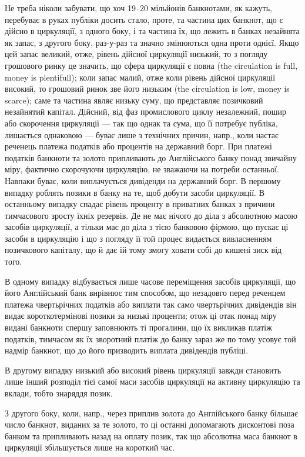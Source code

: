 
Не треба ніколи забувати, що хоч 19--20 мільйонів банкнотами, як
кажуть, перебуває в руках публіки досить стало, проте, та частина цих банкнот,
що є дійсно в циркуляції, з одного боку, і та частина їх, що лежить в банках
незайнята як запас, з другого боку, раз-у-раз та значно змінюються одна
проти однієї. Якщо цей запас великий, отже, рівень дійсної циркуляції низький,
то з погляду грошового ринку це значить, що сфера циркуляції є повна (the
circulation is full, money is plentifull); коли запас малий, отже коли рівень
дійсної циркуляції високий, то грошовий ринок зве його низьким (the circulation
is low, money is scarce); саме та частина являє низьку суму, що представляє
позичковий незайнятий капітал. Дійсний, від фаз промислового циклу незалежний,
пошир або скорочення циркуляції — так що однак та сума, що її потребує
публіка, лишається однаковою — буває лише з технічних причин, напр., коли настає
реченець платежа податків або процентів на державний борг. При платежі податків
банкноти та золото припливають до Англійського банку понад звичайну міру,
фактично скорочуючи циркуляцію, не зважаючи на потреби останньої. Навпаки
буває, коли виплачується дивіденди на державний борг. В першому випадку
роблять позики в банку на те, щоб добути засоби циркуляції. В останньому
випадку спадає рівень проценту в приватних банках з причини тимчасового
зросту їхніх резервів. Де не має нічого до діла з абсолютною масою засобів
циркуляції, а тільки має до діла з тією банковою фірмою, що пускає ці засоби
в циркуляцію і що з погляду її той процес видається вивласненням
позичкового капіталу, що й дає їй тому змогу ховати собі до кишені зиск
від того.

В одному випадку відбувається лише часове переміщення засобів циркуляції,
що його Англійський банк вирівнює тим способом, що незадовго перед реченцем
платежа чвертьрічних податків або виплати так само чвертьрічних дивідендів
він видає короткотермінові позики за низькі проценти; отож ці отак понад міру
видані банкноти спершу заповнюють ті прогалини, що їх викликав платіж
податків, тимчасом як їх зворотний платіж до банку зараз же по тому усовує
той надмір банкнот, що до його призводить виплата дивідендів публіці.

В другому випадку низький або високий рівень циркуляції завжди становить
лише інший розподіл тієї самої маси засобів циркуляції на активну циркуляцію
та вклади, тобто знаряддя позик.

З другого боку, коли, напр., через приплив золота до Англійського банку
більшає число банкнот, виданих за те золото, то ці останні допомагають
дисконтові поза банком та припливають назад на оплату позик, так що абсолютна
маса банкнот в циркуляції збільшується лише на короткий час.

